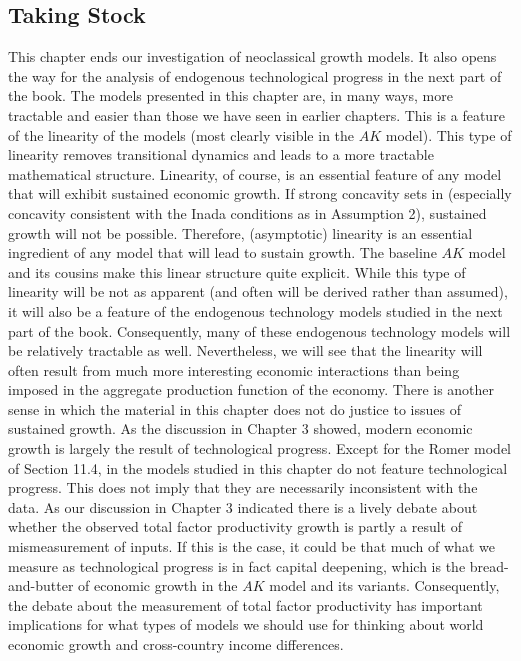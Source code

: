 \documentclass[\topdir/lecture\_notes.tex]{subfiles}
\begin{document}
\subsection{Taking Stock}
This chapter ends our investigation of neoclassical growth models. It also opens the way for the analysis of endogenous technological progress in the next part of the book. The models presented in this chapter are, in many ways, more tractable and easier than those we have seen in earlier chapters. This is a feature of the linearity of the models (most clearly visible in the $AK$ model). This type of linearity removes transitional dynamics and leads to a more tractable mathematical structure. Linearity, of course, is an essential feature of any model that will exhibit sustained economic growth. If strong concavity sets in (especially concavity consistent with the Inada conditions as in Assumption 2), sustained growth will not be possible. Therefore, (asymptotic) linearity is an essential ingredient of any model that will lead to sustain growth. The baseline $AK$ model and its cousins make this linear structure quite explicit. While this type of linearity will be not as apparent (and often will be derived rather than assumed), it will also be a feature of the endogenous technology models studied in the next part of the book. Consequently, many of these endogenous technology models will be relatively tractable as well. Nevertheless, we will see that the linearity will often result from much more interesting economic interactions than being imposed in the aggregate production function of the economy. There is another sense in which the material in this chapter does not do justice to issues of sustained growth. As the discussion in Chapter 3 showed, modern economic growth is largely the result of technological progress. Except for the Romer model of Section 11.4, in the models studied in this chapter do not feature technological progress. This does not imply that they are necessarily inconsistent with the data. As our discussion in Chapter 3 indicated there is a lively debate about whether the observed total factor productivity growth is partly a result of mismeasurement of inputs. If this is the case, it could be that much of what we measure as technological progress is in fact capital deepening, which is the bread-and-butter of economic growth in the $AK$ model and its variants. Consequently, the debate about the measurement of total factor productivity has important implications for what types of models we should use for thinking about world economic growth and cross-country income differences.
\end{document}
